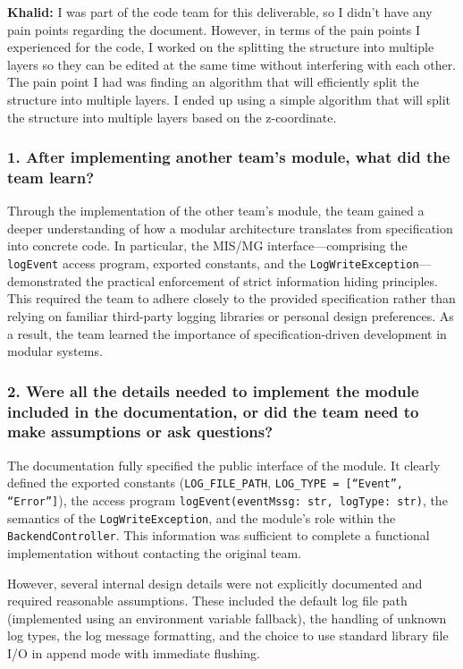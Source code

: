 \documentclass[12pt, titlepage]{article}
\begin{document}
\newline
\newline
\textbf{Khalid: } I was part of the code team for this deliverable, so I didn't have any pain points regarding the document. However, in terms of the pain points I experienced for the code, I worked on the splitting the structure into multiple layers so they can be edited at the same time without interfering with each other. The pain point I had was finding an algorithm that will efficiently split the structure into multiple layers. I ended up using a simple algorithm that will split the structure into multiple layers based on the z-coordinate.

\subsubsection*{1. After implementing another team's module, what did the team learn?}
Through the implementation of the other team’s module, the team gained a deeper understanding of how a modular architecture translates from specification into concrete code. In particular, the MIS/MG interface---comprising the \texttt{logEvent} access program, exported constants, and the \texttt{LogWriteException}---demonstrated the practical enforcement of strict information hiding principles. This required the team to adhere closely to the provided specification rather than relying on familiar third-party logging libraries or personal design preferences. As a result, the team learned the importance of specification-driven development in modular systems.

\subsubsection*{2. Were all the details needed to implement the module included in the documentation, or did the team need to make assumptions or ask questions?}
The documentation fully specified the public interface of the module. It clearly defined the exported constants (\texttt{LOG\_FILE\_PATH}, \texttt{LOG\_TYPE = [``Event'', ``Error'']}), the access program \texttt{logEvent(eventMssg: str, logType: str)}, the semantics of the \texttt{LogWriteException}, and the module’s role within the \texttt{BackendController}. This information was sufficient to complete a functional implementation without contacting the original team.

However, several internal design details were not explicitly documented and required reasonable assumptions. These included the default log file path (implemented using an environment variable fallback), the handling of unknown log types, the log message formatting, and the choice to use standard library file I/O in append mode with immediate flushing.
\end{document}
